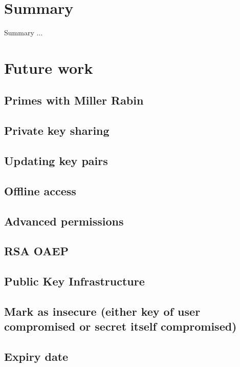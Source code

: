 \chapter{Summary}

Summary ...

\chapter{Future work}

\section{Primes with Miller Rabin}
\section{Private key sharing}
\section{Updating key pairs}
\section{Offline access}
\section{Advanced permissions}
\section{RSA OAEP}
\section{Public Key Infrastructure}
\section{Mark as insecure (either key of user compromised or secret itself compromised)}
\section{Expiry date}
